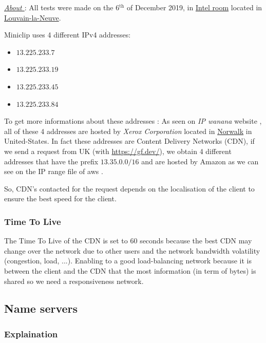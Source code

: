 \documentclass{article}
\begin{document}
\textit{\underline{About }}: All tests were made on the 6$^{\text{th}}$ of December 2019, in \href{https://goo.gl/maps/o6d29MMUkajAf4NXA}{Intel room} located in \href{https://goo.gl/maps/o6d29MMUkajAf4NXA}{Louvain-la-Neuve}.

\vspace{0.5cm}

Miniclip uses 4 different IPv4 addresses: 
\begin{itemize}
    \itemsep-0.1em 
    \item $13.225.233.7$
    \item $13.225.233.19$
    \item $13.225.233.45$
    \item $13.225.233.84$
\end{itemize}

To get more informations about these addresses : As seen on \textit{IP wanana} website \cite{ip}, all of these 4 addresses are hosted by \textit{Xerox Corporation} located in \href{https://goo.gl/maps/ArqaLQaFP1qYbP2j8}{Norwalk} in United-States. In fact these addresses are Content Delivery Networks (CDN), if we send a request from UK (with \url{https://gf.dev/}), we obtain 4 different addresses that have the prefix $13.35.0.0/16$ and are hosted by Amazon as we can see on the IP range file of aws \cite{awsrange}. 

So, CDN's contacted for the request depends on the localisation of the client to ensure the best speed for the client.

\subsubsection{Time To Live}
\label{subsub:ipttl}

The Time To Live of the CDN is set to 60 seconds because the best CDN may change over the network due to other users and the network bandwidth volatility (congestion, load, ...). Enabling to a good load-balancing network because it is between the client and the CDN that the most information (in term of bytes) is shared so we need a responsiveness network.

\subsection{Name servers}
\subsubsection{Explaination}
\label{subsub:nsexp}
\end{document}
